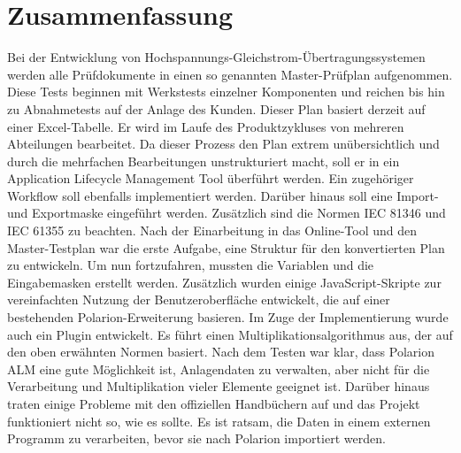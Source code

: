 \chapter*{Zusammenfassung}
\thispagestyle{empty}
%
Bei der Entwicklung von Hochspannungs-Gleichstrom-Übertragungssystemen werden alle Prüfdokumente in einen so genannten Master-Prüfplan aufgenommen. Diese Tests beginnen mit Werkstests einzelner Komponenten und reichen bis hin zu Abnahmetests auf der Anlage des Kunden. Dieser Plan basiert derzeit auf einer Excel-Tabelle. Er wird im Laufe des Produktzykluses von mehreren Abteilungen bearbeitet. Da dieser Prozess den Plan extrem unübersichtlich und durch die mehrfachen Bearbeitungen unstrukturiert macht, soll er in ein Application Lifecycle Management Tool überführt werden. Ein zugehöriger Workflow soll ebenfalls implementiert werden. Darüber hinaus soll eine Import- und Exportmaske eingeführt werden. Zusätzlich sind die Normen IEC 81346 und IEC 61355 zu beachten. Nach der Einarbeitung in das Online-Tool und den Master-Testplan war die erste Aufgabe, eine Struktur für den konvertierten Plan zu entwickeln. Um nun fortzufahren, mussten die Variablen und die Eingabemasken erstellt werden. Zusätzlich wurden einige JavaScript-Skripte zur vereinfachten Nutzung der Benutzeroberfläche entwickelt, die auf einer bestehenden Polarion-Erweiterung basieren. Im Zuge der Implementierung wurde auch ein Plugin entwickelt. Es führt einen Multiplikationsalgorithmus aus, der auf den oben erwähnten Normen basiert. 
Nach dem Testen war klar, dass Polarion ALM eine gute Möglichkeit ist, Anlagendaten zu verwalten, aber nicht für die Verarbeitung und Multiplikation vieler Elemente geeignet ist. Darüber hinaus traten einige Probleme mit den offiziellen Handbüchern auf und das Projekt funktioniert nicht so, wie es sollte. Es ist ratsam, die Daten in einem externen Programm zu verarbeiten, bevor sie nach Polarion importiert werden.
%